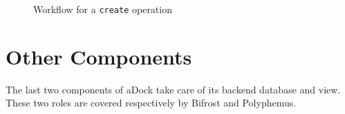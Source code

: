 \begin{figure}[H]
\label{fig:oscard_functioning}
\caption{Workflow for a \texttt{create} operation}
\end{figure}


\section{Other Components}
\label{sec:others}
The last two components of aDock take care of its backend database and view. These two roles are covered respectively by Bifrost and Polyphemus.

